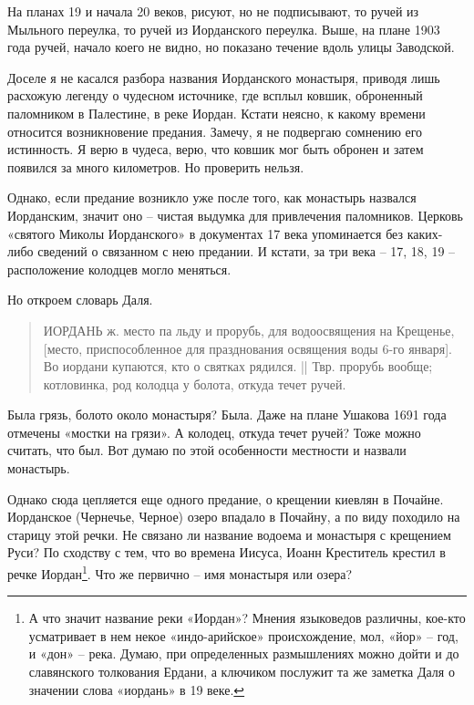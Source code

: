 На планах 19 и начала 20 веков, рисуют, но не подписывают, то ручей из Мыльного переулка, то ручей из Иорданского переулка. Выше, на плане 1903 года ручей, начало коего не видно, но показано течение вдоль улицы Заводской. 

Доселе я не касался разбора названия Иорданского монастыря, приводя лишь расхожую легенду о чудесном источнике, где всплыл ковшик, оброненный паломником в Палестине, в реке Иордан. Кстати неясно, к какому времени относится возникновение предания. Замечу, я не подвергаю сомнению его истинность. Я верю в чудеса, верю, что ковшик мог быть обронен и затем появился за много километров. Но проверить нельзя. 

Однако, если предание возникло уже после того, как монастырь назвался Иорданским, значит оно – чистая выдумка для привлечения паломников. Церковь «святого Миколы Иорданского» в документах 17 века упоминается без каких-либо сведений о связанном с нею предании. И кстати, за три века – 17, 18, 19 – расположение колодцев могло меняться.

Но откроем словарь Даля.

\begin{quotation}
ИОРДАНЬ ж. место па льду и прорубь, для водоосвящения на Крещенье, [место, приспособленное для празднования освящения воды 6-го января]. Во иордани купаются, кто о святках  рядился. || Твр. прорубь вообще; котловинка, род колодца у болота, откуда течет ручей.
\end{quotation}

Была грязь, болото около монастыря? Была. Даже на плане Ушакова 1691 года отмечены «мостки на грязи». А колодец, откуда течет ручей? Тоже можно считать, что был. Вот думаю по этой особенности местности и назвали монастырь.

Однако сюда цепляется еще одного предание, о крещении киевлян в Почайне. Иорданское (Чернечье, Черное) озеро впадало в Почайну, а по виду походило на старицу этой речки. Не связано ли название водоема и монастыря с крещением Руси? По сходству с тем, что во времена Иисуса, Иоанн Креститель крестил в речке Иордан\footnote{А что значит название реки «Иордан»? Мнения языковедов различны, кое-кто усматривает в нем некое «индо-арийское» происхождение, мол, «йор» – год, и «дон» – река. Думаю, при определенных размышлениях можно дойти и до славянского толкования Ердани, а ключиком послужит та же заметка Даля о значении слова «иордань» в 19 веке.}. Что же первично – имя монастыря или озера?
